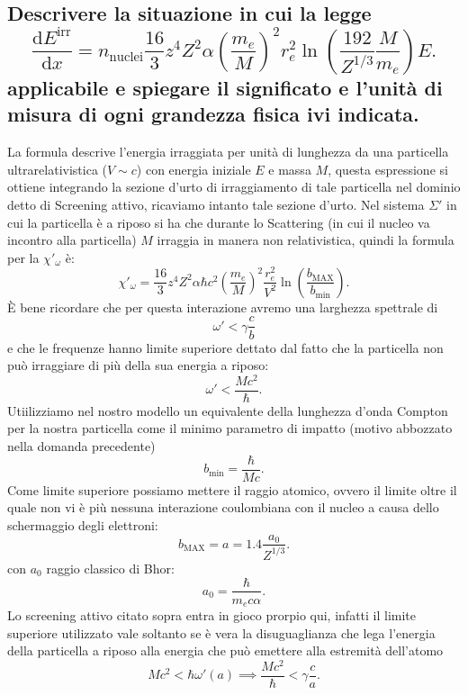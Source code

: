 \subsection[]{Descrivere la situazione in cui la legge
\[
	\frac{\mbox{d}E^{\text{irr}}}{\mbox{d}x}=
	n_{\text{nuclei}}\frac{16}{3}z^4Z^2\alpha\left(\frac{m_e}{M}\right)^2r_e^2\ln\left(\frac{192}{Z^{1 /3}}\frac{M}{m_e}\right) E
.\] 
applicabile e spiegare il significato e l'unità di misura di ogni grandezza fisica ivi indicata.
}\label{sec:4.a.15}
La formula descrive l'energia irraggiata per unità di lunghezza da una particella ultrarelativistica ($V \sim c$) con energia iniziale $E$ e massa $M$, questa espressione si ottiene integrando la sezione d'urto di irraggiamento di tale particella nel dominio detto di Screening attivo, ricaviamo intanto tale sezione d'urto. Nel sistema $\Sigma'$ in cui la particella è a riposo si ha che durante lo Scattering (in cui il nucleo va incontro alla particella) $M$ irraggia in manera non relativistica, quindi la formula per la $\chi'_{\omega}$ è:
\[
	\chi'_{\omega}=\frac{16}{3}z^4Z^2\alpha\hbar c^2 \left( \frac{m_e}{M} \right)^2  \frac{r^2_e}{V^2}\ln\left( \frac{b_{\text{MAX}}}{b_{\text{min}}} \right) 
.\] 
È bene ricordare che per questa interazione avremo una larghezza spettrale di \[
	\omega'< \gamma \frac{c}{b}
\] e che le frequenze hanno limite superiore dettato dal fatto che la particella non può irraggiare di più della sua energia a riposo:
\[
	\omega'< \frac{M c^2}{\hbar}
.\] 
Utiilizziamo nel nostro modello un equivalente della lunghezza d'onda Compton per la nostra particella come il minimo parametro di impatto (motivo abbozzato nella domanda precedente)
\[
	b_{\text{min}}= \frac{\hbar}{Mc}
.\] 
Come limite superiore possiamo mettere il raggio atomico, ovvero il limite oltre il quale non vi è più nessuna interazione coulombiana con il nucleo a causa dello schermaggio degli elettroni:
\[
	b_{\text{MAX}}=a= 1.4 \frac{a_0}{Z^{1 /3}}
.\] 
con $a_0$ raggio classico di Bhor:
 \[
	 a_0 = \frac{\hbar}{m_e c \alpha}
.\] 
Lo screening attivo citato sopra entra in gioco prorpio qui, infatti il limite superiore utilizzato vale soltanto se è vera la disuguaglianza che lega l'energia della particella a riposo alla energia che può emettere alla estremità dell'atomo \[
	Mc^2 < \hbar \omega'\left( a \right)  \implies \frac{M c^2}{\hbar} < \gamma \frac{c}{a}
.\]
